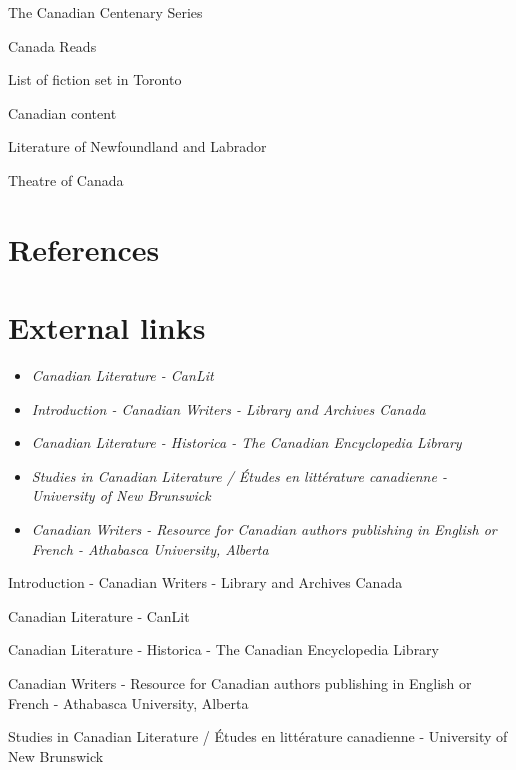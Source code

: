 The Canadian Centenary Series

Canada Reads

List of fiction set in Toronto

Canadian content

Literature of Newfoundland and Labrador

Theatre of Canada

\section{References}\label{references}

\section{External links}\label{external-links}

\begin{itemize}
\item
  \emph{Canadian Literature - CanLit}
\item
  \emph{Introduction - Canadian Writers - Library and Archives Canada}
\item
  \emph{Canadian Literature - Historica - The Canadian Encyclopedia
  Library}
\item
  \emph{Studies in Canadian Literature / Études en littérature
  canadienne - University of New Brunswick}
\item
  \emph{Canadian Writers - Resource for Canadian authors publishing in
  English or French - Athabasca University, Alberta}
\end{itemize}

Introduction - Canadian Writers - Library and Archives Canada

Canadian Literature - CanLit

Canadian Literature - Historica - The Canadian Encyclopedia Library

Canadian Writers - Resource for Canadian authors publishing in English
or French - Athabasca University, Alberta

Studies in Canadian Literature / Études en littérature canadienne -
University of New Brunswick
